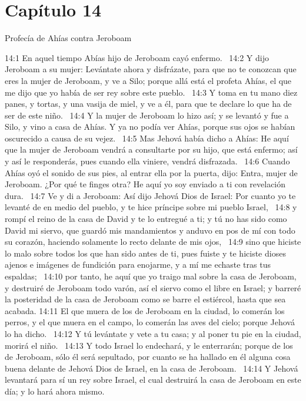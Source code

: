 \section*{Capítulo 14}
Profecía de Ahías contra Jeroboam  

14:1 En aquel tiempo Abías hijo de Jeroboam cayó enfermo.  
14:2 Y dijo Jeroboam a su mujer: Levántate ahora y disfrázate, para que no te conozcan que eres la mujer de Jeroboam, y ve a Silo; porque allá está el profeta Ahías, el que me dijo que yo había de ser rey sobre este pueblo.  
14:3 Y toma en tu mano diez panes, y tortas, y una vasija de miel, y ve a él, para que te declare lo que ha de ser de este niño.  
14:4 Y la mujer de Jeroboam lo hizo así; y se levantó y fue a Silo, y vino a casa de Ahías. Y ya no podía ver Ahías, porque sus ojos se habían oscurecido a causa de su vejez.  
14:5 Mas Jehová había dicho a Ahías: He aquí que la mujer de Jeroboam vendrá a consultarte por su hijo, que está enfermo; así y así le responderás, pues cuando ella viniere, vendrá disfrazada.  
14:6 Cuando Ahías oyó el sonido de sus pies, al entrar ella por la puerta, dijo: Entra, mujer de Jeroboam. ¿Por qué te finges otra? He aquí yo soy enviado a ti con revelación dura.  
14:7 Ve y di a Jeroboam: Así dijo Jehová Dios de Israel: Por cuanto yo te levanté de en medio del pueblo, y te hice príncipe sobre mi pueblo Israel,  
14:8 y rompí el reino de la casa de David y te lo entregué a ti; y tú no has sido como David mi siervo, que guardó mis mandamientos y anduvo en pos de mí con todo su corazón, haciendo solamente lo recto delante de mis ojos,  
14:9 sino que hiciste lo malo sobre todos los que han sido antes de ti, pues fuiste y te hiciste dioses ajenos e imágenes de fundición para enojarme, y a mí me echaste tras tus espaldas;  
14:10 por tanto, he aquí que yo traigo mal sobre la casa de Jeroboam, y destruiré de Jeroboam todo varón, así el siervo como el libre en Israel; y barreré la posteridad de la casa de Jeroboam como se barre el estiércol, hasta que sea acabada. 
14:11 El que muera de los de Jeroboam en la ciudad, lo comerán los perros, y el que muera en el campo, lo comerán las aves del cielo; porque Jehová lo ha dicho.  
14:12 Y tú levántate y vete a tu casa; y al poner tu pie en la ciudad, morirá el niño.  
14:13 Y todo Israel lo endechará, y le enterrarán; porque de los de Jeroboam, sólo él será sepultado, por cuanto se ha hallado en él alguna cosa buena delante de Jehová Dios de Israel, en la casa de Jeroboam.  
14:14 Y Jehová levantará para sí un rey sobre Israel, el cual destruirá la casa de Jeroboam en este día; y lo hará ahora mismo.  
